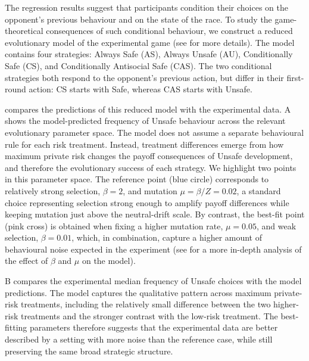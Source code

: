 \documentclass[pdflatex,sn-mathphys-ay]{sn-jnl}
\theoremstyle{thmstyleone}
\theoremstyle{thmstyletwo}
\theoremstyle{thmstylethree}
\begin{document}
The regression results suggest that participants condition their choices on the opponent's previous behaviour and on the state of the race. To study the game-theoretical consequences of such conditional behaviour, we construct a reduced evolutionary model of the experimental game (see  for more details). The model contains four strategies: Always Safe (AS), Always Unsafe (AU), Conditionally Safe (CS), and Conditionally Antisocial Safe (CAS). The two conditional strategies both respond to the opponent's previous action, but differ in their first-round action: CS starts with Safe, whereas CAS starts with Unsafe.

 compares the predictions of this reduced model with the experimental data. A shows the model-predicted frequency of Unsafe behaviour across the relevant evolutionary parameter space. The model does not assume a separate behavioural rule for each risk treatment. Instead, treatment differences emerge from how maximum private risk changes the payoff consequences of Unsafe development, and therefore the evolutionary success of each strategy. We highlight two points in this parameter space. The reference point (blue circle) corresponds to relatively strong selection, $\beta=2$, and mutation $\mu=\beta/Z=0.02$, a standard choice representing selection strong enough to amplify payoff differences while keeping mutation just above the neutral-drift scale. By contrast, the best-fit point (pink cross) is obtained when fixing a higher mutation rate, $\mu=0.05$, and weak selection, $\beta=0.01$, which, in combination, capture a higher amount of behavioural noise expected in the experiment (see  for a more in-depth analysis of the effect of $\beta$ and $\mu$ on the model).

B compares the experimental median frequency of Unsafe choices with the model predictions. The model captures the qualitative pattern across maximum private-risk treatments, including the relatively small difference between the two higher-risk treatments and the stronger contrast with the low-risk treatment. The best-fitting parameters therefore suggests that the experimental data are better described by a setting with more noise than the reference case, while still preserving the same broad strategic structure.
\end{document}
